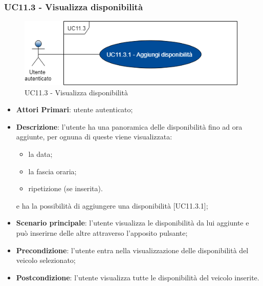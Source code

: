 \subsubsection{UC11.3 - Visualizza disponibilità}
\begin{figure}[H]
	\includegraphics[width=11cm]{res/images/UC11Disponibile.png}
	\centering
	\caption{UC11.3 - Visualizza disponibilità}
\end{figure}
\begin{itemize}
	\item \textbf{Attori Primari}: utente autenticato;
	\item \textbf{Descrizione}: l'utente ha una panoramica delle disponibilità fino ad ora aggiunte, per ognuna di queste viene visualizzata:
	\begin{itemize}
		\item la data;
		\item la fascia oraria;
		\item ripetizione (se inserita).
	\end{itemize} 
	e ha la possibilità di aggiungere una disponibilità [UC11.3.1];
	\item \textbf{Scenario principale}: l'utente visualizza le disponibilità da lui aggiunte e può inserirne delle altre attraverso l'apposito pulsante;
	\item \textbf{Precondizione}: l'utente entra nella visualizzazione delle disponibilità del veicolo selezionato;
	\item \textbf{Postcondizione}: l'utente visualizza tutte le disponibilità del veicolo inserite. 
\end{itemize}
